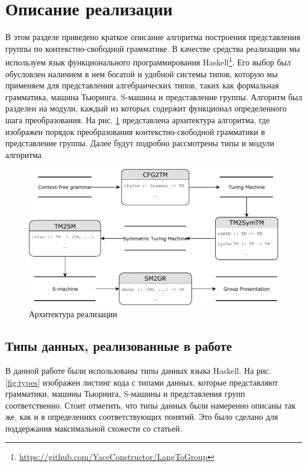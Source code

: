 \documentclass[14pt]{matmex-diploma-custom}
\begin{document}
\section{Описание реализации}

В этом разделе приведено краткое описание алгоритма построения представления
группы по контекстно-свободной грамматике. 
В качестве средства реализации мы используем язык функционального 
программирования Haskell\footnote{\url{https://github.com/YaccConstructor/LangToGroup}}.
Его выбор был обусловлен наличием в нем богатой и удобной системы типов,
которую мы применяем для представления алгебраических типов, таких как формальная грамматика,
машина Тьюринга, S-машина и представление группы. 
Алгоритм был разделен на модули, каждый из которых
содержит функционал определенного шага преобразования. 
На рис. \ref{fig:arch} представлена архитектура алгоритма,
где изображен порядок преобразования контекстно-свободной грамматики 
в представление группы. Далее будут подробно рассмотрены типы и модули алгоритма.

\begin{figure}[H]
\centering
  \includegraphics[width=\linewidth]{pics/diplomaSmallUML.pdf}
  \caption{Архитектура реализации}
  \label{fig:arch}
\end{figure}

\subsection{Типы данных, реализованные в работе}
В данной работе были использованы типы данных языка Haskell. На рис. \ref{fig:types} изображен листинг кода с типами данных, которые представляют грамматики, машины Тьюринга, S-машины и представления групп соответственно. Стоит отметить, что типы данных были намеренно описаны так же, как и в определениях соответствующих понятий. Это было сделано для поддержания максимальной схожести со статьей. 
\end{document}
